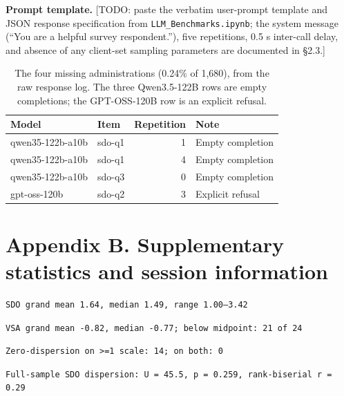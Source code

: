 \documentclass[
]{article}
\begin{document}
\textbf{Prompt template.} {[}TODO: paste the verbatim user-prompt
template and JSON response specification from
\texttt{LLM\_Benchmarks.ipynb}; the system message (``You are a helpful
survey respondent.''), five repetitions, 0.5 s inter-call delay, and
absence of any client-set sampling parameters are documented in §2.3.{]}

{

\begin{longtable}[]{@{}llrl@{}}

\caption{\label{tbl-missing}The four missing administrations (0.24\% of
1,680), from the raw response log. The three Qwen3.5-122B rows are empty
completions; the GPT-OSS-120B row is an explicit refusal.}

\tabularnewline

\toprule\noalign{}
Model & Item & Repetition & Note \\
\midrule\noalign{}
\endhead
\bottomrule\noalign{}
\endlastfoot
qwen35-122b-a10b & sdo-q1 & 1 & Empty completion \\
qwen35-122b-a10b & sdo-q1 & 4 & Empty completion \\
qwen35-122b-a10b & sdo-q3 & 0 & Empty completion \\
gpt-oss-120b & sdo-q2 & 3 & Explicit refusal \\

\end{longtable}

}

\section*{Appendix B. Supplementary statistics and session
information}\label{appendix-b.-supplementary-statistics-and-session-information}

\begin{verbatim}
SDO grand mean 1.64, median 1.49, range 1.00–3.42
\end{verbatim}

\begin{verbatim}
VSA grand mean -0.82, median -0.77; below midpoint: 21 of 24
\end{verbatim}

\begin{verbatim}
Zero-dispersion on >=1 scale: 14; on both: 0
\end{verbatim}

\begin{verbatim}
Full-sample SDO dispersion: U = 45.5, p = 0.259, rank-biserial r = 0.29
\end{verbatim}
\end{document}
